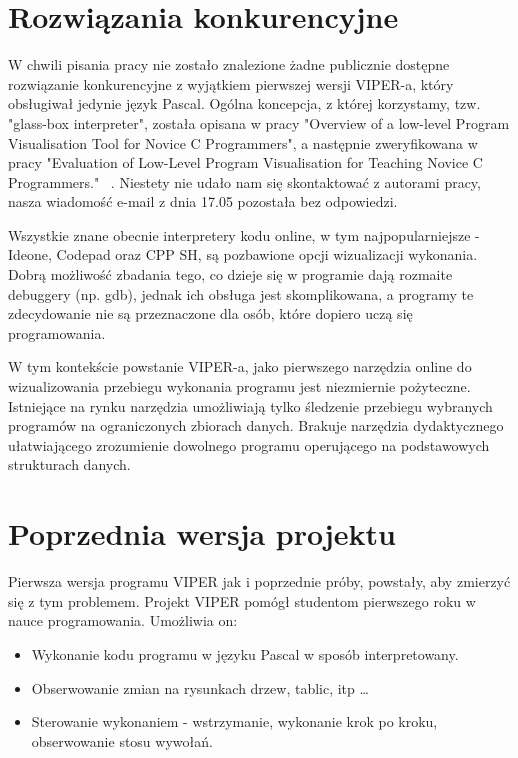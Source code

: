 \documentclass[a4paper,twoside,openright,11pt]{report}
\begin{document}
  \section{Rozwiązania konkurencyjne}
\par W chwili pisania pracy nie zostało znalezione żadne publicznie dostępne rozwiązanie konkurencyjne z wyjątkiem pierwszej wersji VIPER-a, który obsługiwał jedynie język Pascal. Ogólna koncepcja, z której korzystamy, tzw. "glass-box interpreter", została opisana w pracy "Overview of a low-level Program Visualisation Tool for Novice C Programmers"\cite{overview-vistool}, a następnie zweryfikowana w pracy "Evaluation of Low-Level Program Visualisation for Teaching Novice C Programmers." ~\cite{evaluation-vistool}. Niestety nie udało nam się skontaktować z autorami pracy, nasza wiadomość e-mail z dnia 17.05 pozostała bez odpowiedzi.
\par Wszystkie znane obecnie interpretery kodu online, w tym najpopularniejsze - Ideone, Codepad oraz CPP SH, są pozbawione opcji wizualizacji wykonania. Dobrą możliwość zbadania tego, co dzieje się w programie dają rozmaite debuggery (np. gdb), jednak ich obsługa jest skomplikowana, a programy te zdecydowanie nie są przeznaczone dla osób, które dopiero uczą się programowania.
\par W tym kontekście powstanie VIPER-a, jako pierwszego narzędzia online do wizualizowania przebiegu wykonania programu jest niezmiernie pożyteczne. Istniejące na rynku narzędzia umożliwiają tylko śledzenie przebiegu wybranych programów na ograniczonych zbiorach danych. Brakuje narzędzia dydaktycznego ułatwiającego zrozumienie dowolnego programu operującego na podstawowych strukturach danych. 

  \section{Poprzednia wersja projektu}
\par Pierwsza wersja programu VIPER jak i poprzednie próby, powstały, aby zmierzyć się z tym problemem. Projekt VIPER pomógł studentom pierwszego roku w nauce programowania. Umożliwia on:
\begin{itemize}

  \item Wykonanie kodu programu w języku Pascal w sposób interpretowany.
  \item Obserwowanie zmian na rysunkach drzew, tablic, itp \ldots
  \item Sterowanie wykonaniem - wstrzymanie, wykonanie krok po kroku, obserwowanie stosu wywołań.

\end{itemize}
 
\end{document}
